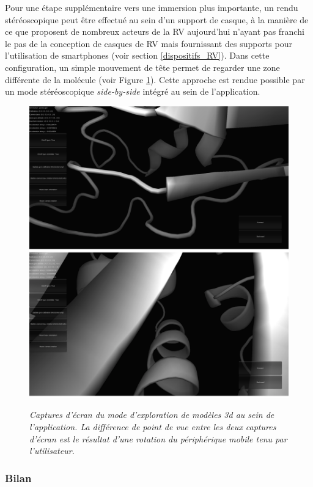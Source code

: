 Pour une étape supplémentaire vers une immersion plus importante, un rendu stéréoscopique peut être effectué au sein d'un support de casque, à la manière de ce que proposent de nombreux acteurs de la RV aujourd'hui n'ayant pas franchi le pas de la conception de casques de RV mais fournissant des supports pour l'utilisation de smartphones (voir section \ref{dispositifs_RV}). Dans cette configuration, un simple mouvement de tête permet de regarder une zone différente de la molécule (voir Figure \ref{Fig:molexplorer_screenshot}). Cette approche est rendue possible par un mode stéréoscopique \textit{side-by-side} intégré au sein de l'application. 

\begin{figure}[h]
  \centering
  {\includegraphics[width=.75\linewidth]{./figures/ch3/molexplorer_screenshot.png}}
    \caption[Captures d'écran du mode d'exploration de modèles 3d au sein de l'application.]{{\it Captures d'écran du mode d'exploration de modèles 3d au sein de l'application. La différence de point de vue entre les deux captures d'écran est le résultat d'une rotation du périphérique mobile tenu par l'utilisateur.}}
  \label{Fig:molexplorer_screenshot}
  \hspace{0.2cm}
\end{figure}

\subsubsection{Bilan}

